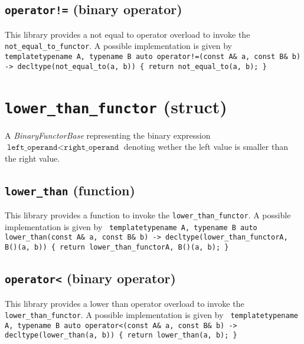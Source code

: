\documentclass[oneside]{book}
\begin{document}
\subsection{\texttt{operator!=} (binary operator)}
This library provides a not equal to operator overload to invoke the \texttt{not\_equal\_to\_functor}.
A possible implementation is given by\newline
\texttt{
template\textlangle typename A, typename B\textrangle\newline
auto operator!=(const A\& a, const B\& b)\newline
-> decltype(not\_equal\_to(a, b))\newline
\{ return not\_equal\_to(a, b); \}
}

\section{\texttt{lower\_than\_functor} (struct)}
A \textit{BinaryFunctorBase} representing the binary expression
$\texttt{left\_operand} < \texttt{right\_operand}$
denoting wether the left value is smaller than the right value.\newline

\subsection{\texttt{lower\_than} (function)}
This library provides a function to invoke the \texttt{lower\_than\_functor}.
A possible implementation is given by\newline
\texttt{
template\textlangle typename A, typename B\textrangle\newline
auto lower\_than(const A\& a, const B\& b)\newline
-> decltype(lower\_than\_functor\textlangle A, B\textrangle()(a, b))\newline
\{ return lower\_than\_functor\textlangle A, B\textrangle()(a, b); \}
}

\subsection{\texttt{operator<} (binary operator)}
This library provides a lower than operator overload to invoke the \texttt{lower\_than\_functor}.
A possible implementation is given by\newline
\texttt{
template\textlangle typename A, typename B\textrangle\newline
auto operator<(const A\& a, const B\& b)\newline
-> decltype(lower\_than(a, b))\newline
\{ return lower\_than(a, b); \}
}
\end{document}
